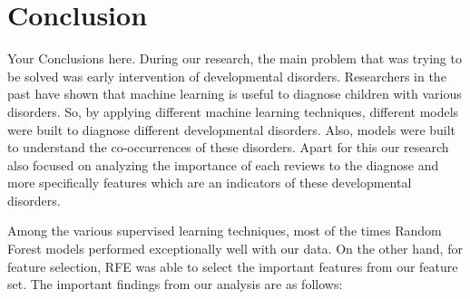 \chapter{Conclusion}
\thispagestyle{plainbottom}
Your Conclusions here.
During our research, the main problem that was trying to be solved was early intervention of developmental disorders. Researchers in the past have shown that machine learning is useful to diagnose children with various disorders. So, by applying different machine learning techniques, different models were built to diagnose different developmental disorders. Also, models were built to understand the co-occurrences of these disorders. Apart for this our research also focused on analyzing the importance of each reviews to the diagnose and more specifically features which are an indicators of these developmental disorders.

Among the various supervised learning techniques, most of the times Random Forest models performed exceptionally well with our data. On the other hand, for feature selection, RFE was able to select the important features from our feature set. The important findings from our analysis are as follows:

